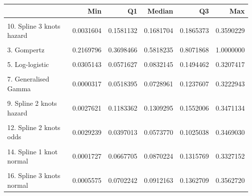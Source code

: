 \documentclass[
]{article}
\begin{document}
\begin{tabular}{lrrrrr}
\toprule
  & Min & Q1 & Median & Q3 & Max\\
\midrule
\cellcolor{gray!6}{1. Exponential} & \cellcolor{gray!6}{0.2449482} & \cellcolor{gray!6}{0.2449482} & \cellcolor{gray!6}{0.2449482} & \cellcolor{gray!6}{0.2449482} & \cellcolor{gray!6}{0.2449482}\\
10. Spline 3 knots hazard & 0.0031604 & 0.1581132 & 0.1681704 & 0.1865373 & 0.3590229\\
\cellcolor{gray!6}{2. Weibull} & \cellcolor{gray!6}{0.0907442} & \cellcolor{gray!6}{0.4105709} & \cellcolor{gray!6}{0.4790585} & \cellcolor{gray!6}{0.5216195} & \cellcolor{gray!6}{0.5525972}\\
3. Gompertz & 0.2169796 & 0.3698466 & 0.5818235 & 0.8071868 & 1.0000000\\
\cellcolor{gray!6}{4. Log-normal} & \cellcolor{gray!6}{0.0022958} & \cellcolor{gray!6}{0.1000774} & \cellcolor{gray!6}{0.1279068} & \cellcolor{gray!6}{0.1841659} & \cellcolor{gray!6}{0.3070152}\\
5. Log-logistic & 0.0305143 & 0.0571627 & 0.0832145 & 0.1494462 & 0.3207417\\
\cellcolor{gray!6}{6. Gamma} & \cellcolor{gray!6}{0.0471845} & \cellcolor{gray!6}{0.3701940} & \cellcolor{gray!6}{0.3852535} & \cellcolor{gray!6}{0.3907371} & \cellcolor{gray!6}{0.3935697}\\
7. Generalised Gamma & 0.0000317 & 0.0518395 & 0.0728961 & 0.1237607 & 0.3222943\\
\cellcolor{gray!6}{8. Spline 1 knot hazard} & \cellcolor{gray!6}{0.0048605} & \cellcolor{gray!6}{0.0929348} & \cellcolor{gray!6}{0.1060806} & \cellcolor{gray!6}{0.1322263} & \cellcolor{gray!6}{0.3462113}\\
9. Spline 2 knots hazard & 0.0027621 & 0.1183362 & 0.1309295 & 0.1552006 & 0.3471134\\
\cellcolor{gray!6}{11. Spline 1 knot odds} & \cellcolor{gray!6}{0.0040186} & \cellcolor{gray!6}{0.0370407} & \cellcolor{gray!6}{0.0534928} & \cellcolor{gray!6}{0.0956147} & \cellcolor{gray!6}{0.3493116}\\
12. Spline 2 knots odds & 0.0029239 & 0.0397013 & 0.0573770 & 0.1025038 & 0.3469030\\
\cellcolor{gray!6}{13. Spline 3 knots odds} & \cellcolor{gray!6}{0.0031346} & \cellcolor{gray!6}{0.0443526} & \cellcolor{gray!6}{0.0641665} & \cellcolor{gray!6}{0.1145082} & \cellcolor{gray!6}{0.3547245}\\
14. Spline 1 knot normal & 0.0001727 & 0.0667705 & 0.0870224 & 0.1315769 & 0.3327152\\
\cellcolor{gray!6}{15. Spline 2 knots normal} & \cellcolor{gray!6}{0.0003302} & \cellcolor{gray!6}{0.0575542} & \cellcolor{gray!6}{0.0758377} & \cellcolor{gray!6}{0.1164719} & \cellcolor{gray!6}{0.3361441}\\
16. Spline 3 knots normal & 0.0005575 & 0.0702242 & 0.0912163 & 0.1362709 & 0.3562720\\
\bottomrule
\end{tabular}
\end{document}
